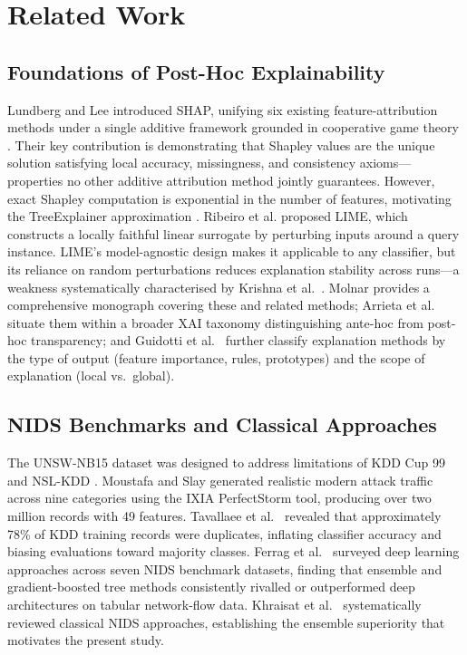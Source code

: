 \documentclass[conference]{IEEEtran}
\begin{document}
\section{Related Work}

\subsection{Foundations of Post-Hoc Explainability}

Lundberg and Lee \cite{lundberg2017} introduced SHAP, unifying six existing feature-attribution methods under a single additive framework grounded in cooperative game theory \cite{shapley1953}. Their key contribution is demonstrating that Shapley values are the unique solution satisfying local accuracy, missingness, and consistency axioms---properties no other additive attribution method jointly guarantees. However, exact Shapley computation is exponential in the number of features, motivating the TreeExplainer approximation \cite{lundberg2020trees}. Ribeiro et al. \cite{ribeiro2016} proposed LIME, which constructs a locally faithful linear surrogate by perturbing inputs around a query instance. LIME's model-agnostic design makes it applicable to any classifier, but its reliance on random perturbations reduces explanation stability across runs---a weakness systematically characterised by Krishna et al.\ \cite{krishna2022}. Molnar \cite{molnar2020} provides a comprehensive monograph covering these and related methods; Arrieta et al.\ \cite{arrieta2020} situate them within a broader XAI taxonomy distinguishing ante-hoc from post-hoc transparency; and Guidotti et al.\ \cite{guidotti2018} further classify explanation methods by the type of output (feature importance, rules, prototypes) and the scope of explanation (local vs.\ global).

\subsection{NIDS Benchmarks and Classical Approaches}

The UNSW-NB15 dataset \cite{moustafa2015} was designed to address limitations of KDD Cup 99 and NSL-KDD \cite{tavallaee2009}. Moustafa and Slay generated realistic modern attack traffic across nine categories using the IXIA PerfectStorm tool, producing over two million records with 49 features. Tavallaee et al.\ \cite{tavallaee2009} revealed that approximately 78\% of KDD training records were duplicates, inflating classifier accuracy and biasing evaluations toward majority classes. Ferrag et al.\ \cite{ferrag2020} surveyed deep learning approaches across seven NIDS benchmark datasets, finding that ensemble and gradient-boosted tree methods consistently rivalled or outperformed deep architectures on tabular network-flow data. Khraisat et al.\ \cite{khraisat2019} systematically reviewed classical NIDS approaches, establishing the ensemble superiority that motivates the present study.
\end{document}
